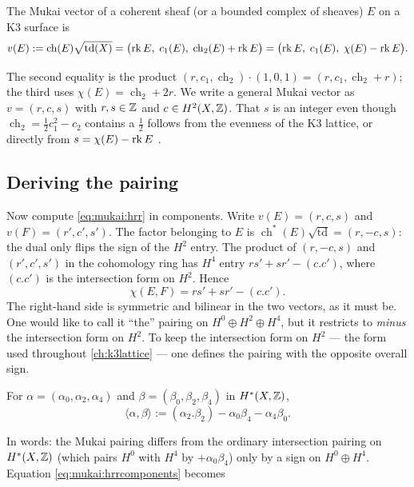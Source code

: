 \begin{definition}\label{def:mukai:vector}
The Mukai vector of a coherent sheaf (or a bounded complex of sheaves) $E$ on a K3 surface is
\begin{equation}\label{eq:mukai:vector}
  v(E):=\operatorname{ch}(E)\sqrt{\operatorname{td}(X)}
  =\bigl(\operatorname{rk} E,\;c_1(E),\;\operatorname{ch}_2(E)+\operatorname{rk} E\bigr)
  =\bigl(\operatorname{rk} E,\;c_1(E),\;\chi(E)-\operatorname{rk} E\bigr).
\end{equation}
\end{definition}
The second equality is the product $(r,c_1,\operatorname{ch}_2)\cdot(1,0,1)=(r,c_1,
\operatorname{ch}_2+r)$; the third uses $\chi(E)=\operatorname{ch}_2+2r$. We write a general
Mukai vector as $v=(r,c,s)$ with $r,s\in\mathbb{Z}$ and $c\in H^2(X,\mathbb{Z})$. That $s$ is an integer even
though $\operatorname{ch}_2=\frac12c_1^2-c_2$ contains a $\frac12$ follows from the evenness
of the K3 lattice, or directly from $s=\chi(E)-\operatorname{rk} E$
.

\subsection{Deriving the pairing}
Now compute \eqref{eq:mukai:hrr} in components. Write $v(E)=(r,c,s)$ and $v(F)=(r',c',s')$.
The factor belonging to $E$ is $\operatorname{ch}^*(E)\sqrt{\operatorname{td}}=(r,-c,s)$: the
dual only flips the sign of the $H^2$ entry. The product of $(r,-c,s)$ and $(r',c',s')$ in the
cohomology ring has $H^4$ entry $rs'+sr'-(c.c')$, where $(c.c')$ is the intersection form on
$H^2$. Hence
\begin{equation}\label{eq:mukai:hrrcomponents}
  \chi(E,F)=rs'+sr'-(c.c').
\end{equation}
The right-hand side is symmetric and bilinear in the two vectors, as it must be. One would like
to call it ``the'' pairing on $H^0\oplus H^2\oplus H^4$, but it restricts to \emph{minus} the
intersection form on $H^2$. To keep the intersection form on $H^2$ --- the form used throughout
\cref{ch:k3lattice} --- one defines the pairing with the opposite overall sign.

\begin{definition}\label{def:mukai:pairing}
For $\alpha=(\alpha_0,\alpha_2,\alpha_4)$ and $\beta=(\beta_0,\beta_2,\beta_4)$ in
$H^*(X,\mathbb{Z})$,
\begin{equation}\label{eq:mukai:pairing}
  \langle\alpha,\beta\rangle:=(\alpha_2.\beta_2)-\alpha_0\beta_4-\alpha_4\beta_0 .
\end{equation}
\end{definition}
In words: the Mukai pairing differs from the ordinary intersection pairing on $H^*(X,\mathbb{Z})$
(which pairs $H^0$ with $H^4$ by $+\alpha_0\beta_4$) only by a sign on $H^0\oplus H^4$.
Equation \eqref{eq:mukai:hrrcomponents} becomes

